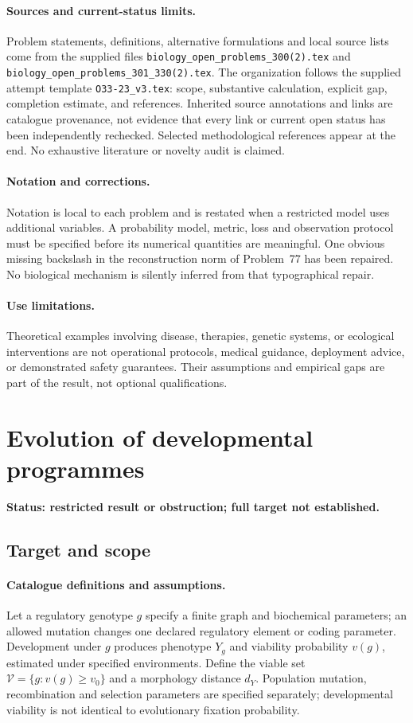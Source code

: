 \documentclass[11pt]{article}
\begin{document}
\paragraph{Sources and current-status limits.}
Problem statements, definitions, alternative formulations and local source lists
come from the supplied files
\texttt{biology\_open\_problems\_300(2).tex} and
\texttt{biology\_open\_problems\_301\_330(2).tex}.
The organization follows the supplied attempt template
\texttt{O33-23\_v3.tex}: scope, substantive calculation, explicit gap,
completion estimate, and references. Inherited source annotations and links are
catalogue provenance, not evidence that every link or current open status has
been independently rechecked. Selected methodological references appear at the
end. No exhaustive literature or novelty audit is claimed.

\paragraph{Notation and corrections.}
Notation is local to each problem and is restated when a restricted model uses
additional variables. A probability model, metric, loss and observation protocol
must be specified before its numerical quantities are meaningful. One obvious
missing backslash in the reconstruction norm of Problem~77 has been repaired.
No biological mechanism is silently inferred from that typographical repair.

\paragraph{Use limitations.}
Theoretical examples involving disease, therapies, genetic systems, or ecological
interventions are not operational protocols, medical guidance, deployment advice,
or demonstrated safety guarantees. Their assumptions and empirical gaps are part
of the result, not optional qualifications.


\section*{Evolution of developmental programmes}
\label{prob:140}
\noindent\textbf{Status: restricted result or obstruction; full target not established.}
\subsection{Target and scope}
\paragraph{Catalogue definitions and assumptions.}
Let a regulatory genotype $g$ specify a finite graph and biochemical parameters; an allowed mutation changes one declared regulatory element or coding parameter. Development under $g$ produces phenotype $Y_g$ and viability probability $v(g)$, estimated under specified environments. Define the viable set $\mathcal V=\{g:v(g)\geq v_0\}$ and a morphology distance $d_Y$. Population mutation, recombination and selection parameters are specified separately; developmental viability is not identical to evolutionary fixation probability.
\end{document}
